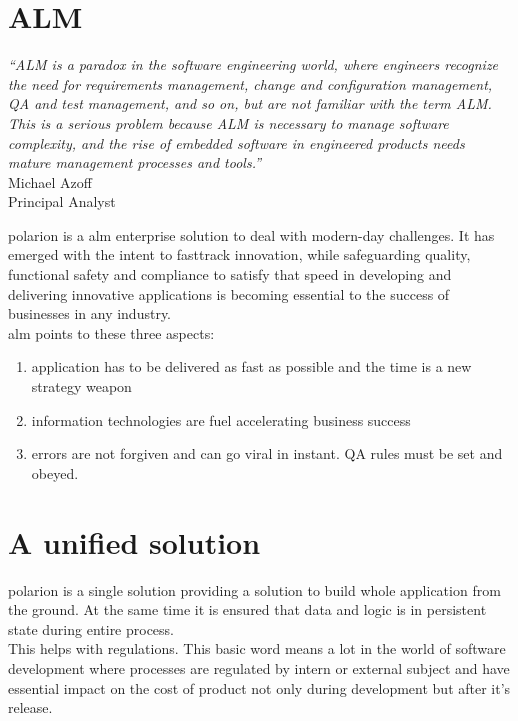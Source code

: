 \documentclass[thesis=M,english]{FITthesis}[2012/06/26]
\begin{document}
\section{ALM}

\begin{center}
	\textit{“ALM is a paradox in the software engineering
		world, where engineers recognize
		the need for requirements management,
		change and configuration management, QA
		and test management, and so on, but are
		not familiar with the term ALM. This is a
		serious problem because ALM is necessary
		to manage software complexity, and the rise
		of embedded software in engineered products
		needs mature management processes
		and tools.”}\\
	Michael Azoff\\
	Principal Analyst\\
\end{center}

\acrshort{polarion} is a \acrshort{alm} enterprise solution to deal with modern-day challenges. It has emerged with the intent to fasttrack
innovation, while safeguarding quality, functional safety and compliance to satisfy that speed in developing and delivering innovative applications is becoming essential to the success of businesses in any industry.\\

\pagebreak
\acrshort{alm} points to these three aspects:
\begin{enumerate}[nosep]
	\item application has to be delivered as fast as possible and the time is a new strategy weapon 
	\item information technologies are fuel accelerating business success
	\item errors are not forgiven and can go viral in instant. QA rules must be set and obeyed.
\end{enumerate}

\section{A unified solution}

\acrshort{polarion} is a single solution providing a solution to build whole application from the ground. At the same time it is ensured that data and logic is in persistent state during entire process.\\ 

This helps with regulations. This basic word means a lot in the world of software development where processes are regulated by intern or external subject and have essential impact on the cost of product not only during development but after it's release.\\
\end{document}
